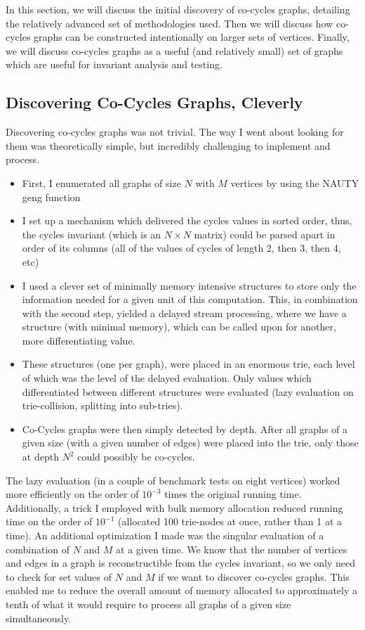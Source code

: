 In this section, we will discuss the initial discovery of co-cycles graphs, detailing the relatively advanced set of methodologies used.
Then we will discuss how co-cycles graphs can be constructed intentionally on larger sets of vertices.
Finally, we will discuss co-cycles graphs as a useful (and relatively small) set of graphs which are useful for invariant analysis and testing.

\subsection{Discovering Co-Cycles Graphs, Cleverly}

Discovering co-cycles graphs was not trivial.
The way I went about looking for them was theoretically simple, but incredibly challenging to implement and process.
\begin{itemize}
\item{First, I enumerated all graphs of size $N$ with $M$ vertices by using the NAUTY geng function}
\item{I set up a mechanism which delivered the cycles values in sorted order, thus, the cycles invariant (which is an $N \times N$ matrix) could be parsed apart in order of its columns (all of the values of cycles of length 2, then 3, then 4, etc)}
\item{I used a clever set of minimally memory intensive structures to store only the information needed for a given unit of this computation.  This, in combination with the second step, yielded a delayed stream processing, where we have a structure (with minimal memory), which can be called upon for another, more differentiating value.}
\item{These structures (one per graph), were placed in an enormous trie, each level of which was the level of the delayed evaluation.  Only values which differentiated between different structures were evaluated (lazy evaluation on trie-collision, splitting into sub-tries).}
\item{Co-Cycles graphs were then simply detected by depth. After all graphs of a given size (with a given number of edges) were placed into the trie, only those at depth $N^2$ could possibly be co-cycles.}
\end{itemize}

The lazy evaluation (in a couple of benchmark tests on eight vertices) worked more efficiently on the order of $10^{-3}$ times the original running time.
Additionally, a trick I employed with bulk memory allocation reduced running time on the order of $10^{-1}$ (allocated 100 trie-nodes at once, rather than 1 at a time).
An additional optimization I made was the singular evaluation of a combination of $N$ and $M$ at a given time.
We know that the number of vertices and edges in a graph is reconstructible from the cycles invariant, so we only need to check for set values of $N$ and $M$ if we want to discover co-cycles graphs.
This enabled me to reduce the overall amount of memory allocated to approximately a tenth of what it would require to process all graphs of a given size simultaneously.

